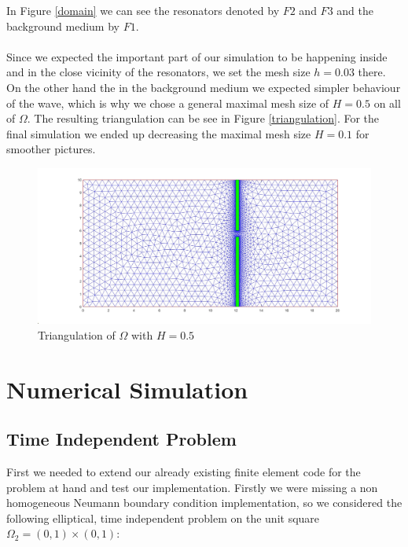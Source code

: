\documentclass{article}
\begin{document}
In Figure \eqref{domain} we can see the resonators denoted by $F2$ and $F3$ and the background medium by $F1$. \\ \\

Since we expected the important part of our simulation to be happening inside and in the close vicinity of the resonators, we set the mesh size $h = 0.03$ there. On the other hand the in the background medium we expected simpler behaviour of the wave, which is why we chose a general maximal mesh size of $H = 0.5$ on all of $\Omega$. The resulting triangulation can be see in Figure \eqref{triangulation}. For the final simulation we ended up decreasing the maximal mesh size $H = 0.1$ for smoother pictures.

\begin{figure}[h]
\centering
\includegraphics[width = \linewidth]{triangulation.jpg}
\caption{Triangulation of $\Omega$ with $H = 0.5$}
\label{triangulation}
\end{figure}

\section{Numerical Simulation}
\subsection{Time Independent Problem}
First we needed to extend our already existing finite element code for the problem at hand and test our implementation. Firstly we were missing a non homogeneous Neumann boundary condition implementation, so we considered the following elliptical, time independent problem on the unit square $\Omega_2 = (0,1) \times (0,1)$:
\end{document}
